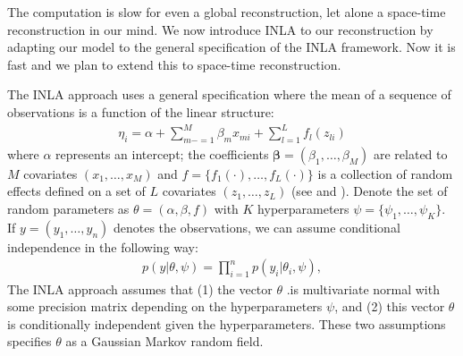\documentclass[11pt]{amsart}
\theoremstyle{plain}
\theoremstyle{definition}
\theoremstyle{remark}
\begin{document}
The computation is slow for even a global reconstruction, let alone a space-time reconstruction in our mind. We now introduce INLA to our reconstruction by adapting our model to the general specification of  the INLA framework. Now it is fast and we plan to extend this to space-time reconstruction. 

The INLA approach uses a general specification where the mean of a sequence of
observations is a function of the linear structure:
\begin{align}\label{eq:meanINLA}
  \eta_i = \alpha +\sum_{m-=1}^M\beta_mx_{mi}+\sum_{l=1}^Lf_l(z_{li})
\end{align}
where $\alpha$ represents an intercept; the coefficients
$\mathbf{\beta} = (\beta_1,\ldots,\beta_M)$ are related to $M$ covariates
$(x_1,\ldots,x_M)$ and $f = \{f_1(\cdot),\ldots,f_L(\cdot)\}$ is a collection of
random effects defined on a set of $L$ covariates $(z_1,\ldots,z_L)$ (see
\cite{Rue2009} and \cite{Blangiardo2013}). Denote the set of random parameters as
$\theta = (\alpha,\beta,f)$ with $K$ hyperparameters $\psi =
\{\psi_1,\ldots,\psi_K\}$. If $y=(y_1,\ldots,y_n)$ denotes the observations, we
can assume conditional independence in the following way:
\begin{align*}
  p(y|\theta,\psi)=\prod_{i=1}^np(y_i|\theta_i,\psi),
\end{align*}
The INLA approach assumes that (1) the vector $\theta$ .is multivariate normal with
some precision matrix depending on the hyperparameters $\psi$, and (2) this vector
$\theta$ is conditionally independent given the hyperparameters. These two
assumptions specifies $\theta$ as a Gaussian Markov random field.
\end{document}
